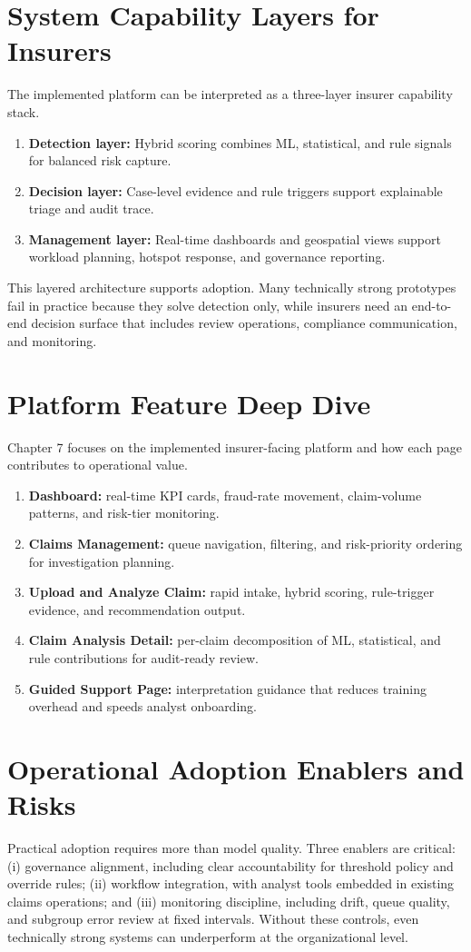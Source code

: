 \documentclass[12pt,a4paper]{report}
\begin{document}
\section{System Capability Layers for Insurers}
The implemented platform can be interpreted as a three-layer insurer capability stack.
\begin{enumerate}
\item \textbf{Detection layer:} Hybrid scoring combines ML, statistical, and rule signals for balanced risk capture.
\item \textbf{Decision layer:} Case-level evidence and rule triggers support explainable triage and audit trace.
\item \textbf{Management layer:} Real-time dashboards and geospatial views support workload planning, hotspot response, and governance reporting.
\end{enumerate}

This layered architecture supports adoption. Many technically strong prototypes fail in practice because they solve detection only, while insurers need an end-to-end decision surface that includes review operations, compliance communication, and monitoring.

\section{Platform Feature Deep Dive}
Chapter 7 focuses on the implemented insurer-facing platform and how each page contributes to operational value.
\begin{enumerate}
\item \textbf{Dashboard:} real-time KPI cards, fraud-rate movement, claim-volume patterns, and risk-tier monitoring.
\item \textbf{Claims Management:} queue navigation, filtering, and risk-priority ordering for investigation planning.
\item \textbf{Upload and Analyze Claim:} rapid intake, hybrid scoring, rule-trigger evidence, and recommendation output.
\item \textbf{Claim Analysis Detail:} per-claim decomposition of ML, statistical, and rule contributions for audit-ready review.
\item \textbf{Guided Support Page:} interpretation guidance that reduces training overhead and speeds analyst onboarding.
\end{enumerate}

\section{Operational Adoption Enablers and Risks}
Practical adoption requires more than model quality. Three enablers are critical: (i) governance alignment, including clear accountability for threshold policy and override rules; (ii) workflow integration, with analyst tools embedded in existing claims operations; and (iii) monitoring discipline, including drift, queue quality, and subgroup error review at fixed intervals. Without these controls, even technically strong systems can underperform at the organizational level.
\end{document}

